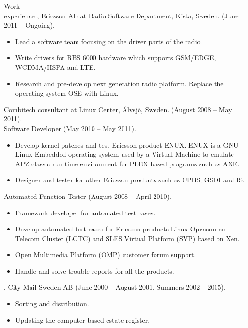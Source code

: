 \documentclass{../../cls/cv}
\author{Samuel Gabrielsson - Curriculum Vitae}
\begin{document}
\maketitle

\begin{category}{Work \\experience}
, Ericsson AB at Radio Software Department, Kista, Sweden. (June 2011 -- Ongoing).
\begin{itemize}
   \item Lead a software team focusing on the driver parts of the radio.
   \item Write drivers for RBS 6000 hardware which supports GSM/EDGE, WCDMA/HSPA and LTE.
   \item Research and pre-develop next generation radio platform. Replace the operating system OSE with Linux.
\end{itemize}

 Combitech consultant at Linux Center, \"Alvsj\"o, Sweden. (August 2008 -- May 2011).\\
Software Developer (May 2010 -- May 2011).
\begin{itemize}
   \item Develop kernel patches and test Ericsson product ENUX. ENUX is a GNU Linux Embedded operating system used by a Virtual Machine to emulate APZ classic run time environment for PLEX based programs such as AXE.
   \item Designer and tester for other Ericsson products such as CPBS, GSDI and IS.
\end{itemize}
Automated Function Tester (August 2008 -- April 2010).
\begin{itemize}
   \item Framework developer for automated test cases.
   \item Develop automated test cases for Ericsson products Linux Opensource Telecom Cluster (LOTC) and SLES Virtual Platform (SVP) based on Xen.
   \item Open Multimedia Platform (OMP) customer forum support.
   \item Handle and solve trouble reports for all the products.
\end{itemize}


, City-Mail Sweden AB (June 2000 -- August 2001, Summers 2002 -- 2005).
\begin{itemize}
   \item Sorting and distribution.
   \item Updating the computer-based estate register.
\end{itemize}


\end{category}
\end{document}
